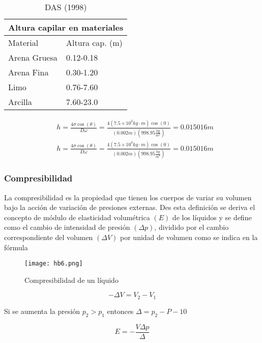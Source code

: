 \begin{table}[h!]
    \centering\begin{tabular}{@{}ll@{}}
    \toprule
    \multicolumn{2}{l}{Altura capilar en materiales} \\ \midrule
    Material              & Altura cap. (m)          \\
    Arena Gruesa          & 0.12-0.18                \\
    Arena Fina            & 0.30-1.20                \\
    Limo                  & 0.76-7.60                \\
    Arcilla               & 7.60-23.0                \\ \bottomrule
    \end{tabular}
    \caption{DAS (1998)}
    \label{tabhb4}
\end{table}
\begin{align*}
    &h=\frac{4\sigma\cos{(\theta)}}{D\omega}=\frac{4(7.5\times 10^{3}kg\cdot m)\cos{(0)}}{(0.002m)(998.95\frac{kg}{m^3})}=0.015016m\\
    &h=\frac{4\sigma\cos{(\theta)}}{D\omega}=\frac{4(7.5\times 10^{3}kg\cdot m)\cos{(0)}}{(0.002m)(998.95\frac{kg}{m^3})}=0.015016m
\end{align*}

\subsubsection{Compresibilidad}
La compresibilidad es la propiedad que tienen los cuerpos de variar su volumen bajo la acción de variación de presiones externas. Des esta definición se deriva el concepto de módulo de elasticidad volumétrica $(E)$ de los líquidos y se define como el cambio de intensidad de presión $(\Delta p)$, dividido por el cambio correspondiente del volumen $(\Delta V)$ por unidad de volumen como se indica en la fórmula

\begin{figure}[h!]
  \centerline{\texttt{[image: hb6.png]}}
  \caption{Compresibilidad de un líquido}
  \label{hb6}
\end{figure}

\begin{equation}
    -\Delta V=V_2-V_1
\end{equation}

Si se aumenta la presión $p_2> p_1$ entonces $\Delta =p_2-P-10$

\begin{equation}
    E=-\frac{V\Delta p}{\Delta}
\end{equation}

